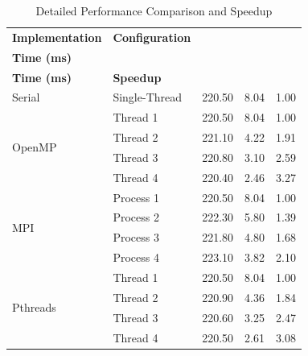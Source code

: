 \documentclass[12pt,a4paper]{article}
\begin{document}
\begin{table}[H]
\centering
\small
\setlength{\tabcolsep}{6pt}
\renewcommand{\arraystretch}{1.3}
\caption{Detailed Performance Comparison and Speedup}
\label{tab:performance_speedup_correlation}
\begin{tabular}{|l|l|c|c|c|}
\hline
\textbf{Implementation} & \textbf{Configuration} & \makecell[c]{\textbf{DB Fetch}\\\textbf{Time (ms)}} & \makecell[c]{\textbf{Calculation}\\\textbf{Time (ms)}} & \textbf{Speedup} \\ \hline
Serial & Single-Thread & 220.50 & 8.04 & 1.00 \\ \hline
\multirow{4}{*}{OpenMP} & Thread 1 & 220.50 & 8.04 & 1.00 \\ \cline{2-5}
 & Thread 2 & 221.10 & 4.22 & 1.91 \\ \cline{2-5}
 & Thread 3 & 220.80 & 3.10 & 2.59 \\ \cline{2-5}
 & Thread 4 & 220.40 & 2.46 & 3.27 \\ \hline
\multirow{4}{*}{MPI} & Process 1 & 220.50 & 8.04 & 1.00 \\ \cline{2-5}
 & Process 2 & 222.30 & 5.80 & 1.39 \\ \cline{2-5}
 & Process 3 & 221.80 & 4.80 & 1.68 \\ \cline{2-5}
 & Process 4 & 223.10 & 3.82 & 2.10 \\ \hline
\multirow{4}{*}{Pthreads} & Thread 1 & 220.50 & 8.04 & 1.00 \\ \cline{2-5}
 & Thread 2 & 220.90 & 4.36 & 1.84 \\ \cline{2-5}
 & Thread 3 & 220.60 & 3.25 & 2.47 \\ \cline{2-5}
 & Thread 4 & 220.50 & 2.61 & 3.08 \\ \hline
\end{tabular}
\end{table}
\end{document}
